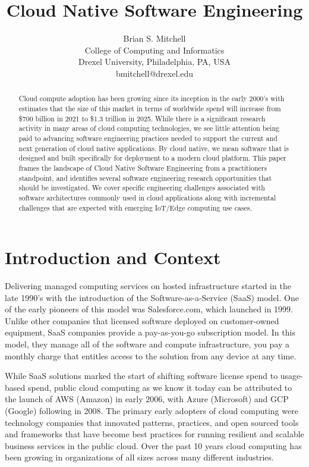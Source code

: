 \documentclass[conference]{IEEEtran}
\title{ 
        	Cloud Native Software Engineering 
      }
\author{
			Brian S. Mitchell\\
			College of Computing and Informatics\\
			Drexel University, Philadelphia, PA, USA\\
			bmitchell@drexel.edu
}
\date{}
\begin{document}
%

\maketitle



\begin{abstract}

Cloud compute adoption has been growing since its inception in the early 2000's with estimates that the size of this market in terms of worldwide spend will increase from \$700 billion in 2021 to \$1.3 trillion in 2025\cite{IDCReport}. While there is a significant research activity in many areas of cloud computing technologies, we see little attention being paid to advancing software engineering practices needed to support the current and next generation of cloud native applications.  By cloud native, we mean software that is designed and built specifically for deployment to a modern cloud platform. This paper frames the landscape of Cloud Native Software Engineering from a practitioners standpoint, and identifies several software engineering research opportunities that should be investigated. We cover specific engineering challenges associated with  software architectures commonly used in cloud applications along with incremental challenges that are expected with emerging IoT/Edge computing use cases. 


\end{abstract}  



\section{Introduction and Context}
\label{Intro}
Delivering managed computing services on hosted infrastructure started in the late 1990's with the introduction of the Software-as-a-Service (SaaS) model. One of the early pioneers of this model was Salesforce.com\cite{SalesforceHistory}, which launched in 1999.  Unlike other companies that licensed software  deployed on customer-owned equipment, SaaS companies provide a pay-as-you-go  subscription model. In this model, they manage all of the software and compute infrastructure, you pay a monthly charge that entitles access to the solution from any device at any time.     

While SaaS solutions marked the start of shifting software license spend to usage-based spend, public cloud computing as we know it today can be attributed to the launch of AWS (Amazon) \cite{AWSLaunch} in early 2006, with Azure (Microsoft)\cite{AzureLaunch} and GCP (Google)\cite{GCPLaunch} following in 2008. The primary early adopters of cloud computing were technology companies that innovated patterns, practices, and open sourced tools and frameworks that have become best practices for running resilient and scalable business services in the public cloud.  Over the past 10 years cloud computing has been growing in organizations of all sizes across many different industries. 
\end{document}
